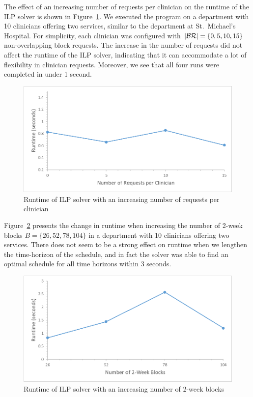 The effect of an increasing number of requests per clinician on the runtime of
the ILP solver is shown in Figure~\ref{fig:runtime-requests}. We executed the
program on a department with 10 clinicians offering two services, similar to the
department at St.\ Michael's Hospital. For simplicity, each clinician was
configured with $\abs{\mathcal{BR}} = \{0, 5, 10, 15\}$ non-overlapping block
requests. The increase in the number of requests did not affect the runtime of
the ILP solver, indicating that it can accommodate a lot of flexibility in
clinician requests. Moreover, we see that all four runs were completed in under
1 second.

\begin{figure}[h]
	\centering
	\includegraphics[scale=.5]{fig/runtime_requests}
	\caption{Runtime of ILP solver with an increasing number of requests per
		clinician}\label{fig:runtime-requests}
\end{figure}

Figure~\ref{fig:runtime-blocks} presents the change in runtime when increasing
the number of 2-week blocks $B = \{26, 52, 78, 104\}$ in a department with 10
clinicians offering two services. There does not seem to be a strong effect on
runtime when we lengthen the time-horizon of the schedule, and in fact the
solver was able to find an optimal schedule for all time horizons within 3
seconds. %

\begin{figure}[h]
	\centering
	\includegraphics[scale=.5]{fig/runtime_blocks}
	\caption{Runtime of ILP solver with an increasing number of 2-week blocks}\label{fig:runtime-blocks}
\end{figure}

